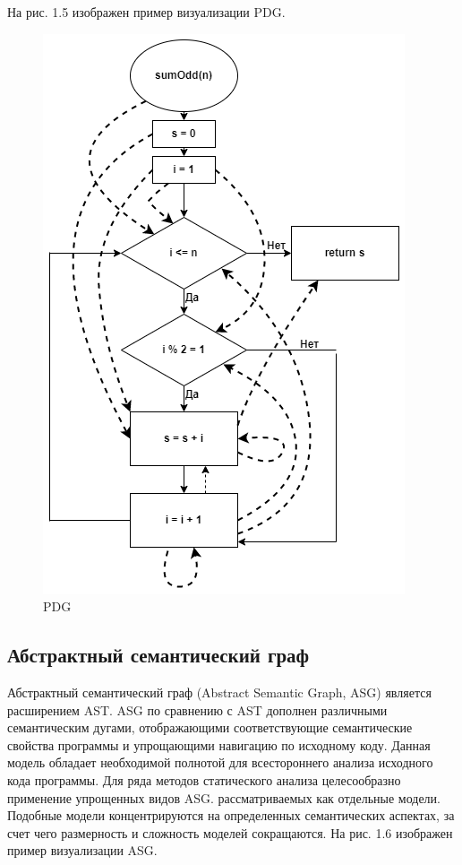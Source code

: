 На рис. 1.5 изображен пример визуализации PDG.

\begin{figure}[h]
	\center
	\includegraphics [scale=0.7] {my_folder/images/my/5}
	\caption{PDG}
	\label{fig:5}  
\end{figure}
\subsection{Абстрактный семантический граф} \label{ch1:subsec-title-abbr}
Абстрактный семантический граф (Abstract Semantic Graph, ASG) является расширением AST. ASG по сравнению с AST дополнен различными семантическим дугами, отображающими соответствующие семантические свойства программы и упрощающими навигацию по исходному коду. Данная модель обладает необходимой полнотой для всестороннего анализа исходного кода программы. Для ряда методов статического анализа целесообразно применение упрощенных видов ASG. рассматриваемых как отдельные модели. Подобные модели концентрируются на определенных семантических аспектах, за счет чего размерность и сложность моделей сокращаются.
На рис. 1.6 изображен пример визуализации ASG.

